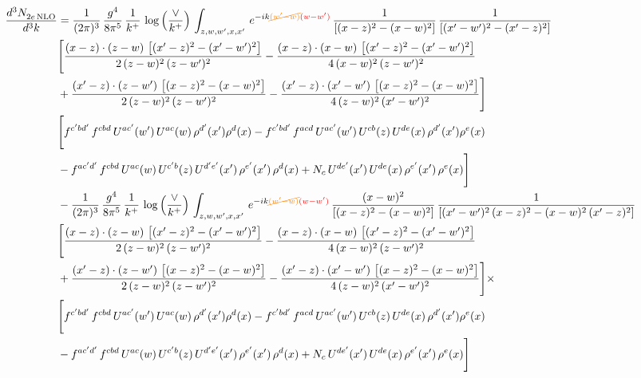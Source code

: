 \documentclass[9pt]{article}
\numberwithin{equation}{section}
\begin{document}
\begin{align}
 \frac{d^{3}N_{2e\,\rm NLO}^{\rm}}{d^{3}k}  & =  \frac{1}{(2\pi)^{3}}\, \frac{g^{4}}{8\pi^{5}}\,\frac{1}{k^{+}}\,\log{\left(\frac{\vee}{k^{+}}\right)}\,\int_{z,w,w^{\prime},x,x'}\, e^{-ik{\color{orange}\cancel{(w^{\prime}-w)}}{\color{red}(w-w^{\prime})}}\, \frac{1}{\left[(x-z)^{2}-(x-w)^{2}\right]}\, \frac{1}{\left[(x'-w')^{2} - (x'-z)^{2}\right]} \notag \\ & \Bigg[\frac{(x-z)\cdot (z-w)\, \left[(x'-z)^{2}-(x'-w')^{2}\right]}{2\, (z-w)^{2}\, (z-w')^{2}}  - \frac{(x-z)\cdot (x-w)\,\left[(x'-z)^{2}-(x'-w')^{2}\right] }{4\,(x-w)^{2}\,(z-w')^{2}}\notag \\ & +\frac{(x'-z)\cdot (z-w')\, \left[(x-z)^{2}-(x-w)^{2}\right]}{2\, (z-w)^{2}\, (z-w')^{2}}-\frac{(x'-z)\cdot (x'-w')\, \left[(x-z)^{2}-(x-w)^{2}\right]}{4\, (z-w)^{2}\,(x'-w')^{2}}\Bigg]\notag \\ & \Bigg[f^{c'bd'}\,f^{cbd}\, U^{ac'}(w')\,U^{ac}(w)\,\rho^{d'}(x')\rho^{d}(x)- f^{c'bd'}\,f^{acd}\,U^{ac'}(w')\,U^{cb}(z)\,U^{de}(x)\,\rho^{d'}(x')\rho^{e}(x) \notag \\ & -f^{ac'd'}\,f^{cbd}\,U^{ac}(w)\,U^{c'b}(z)\,U^{d'e'}(x')\,\rho^{e'}(x')\,\rho^{d}(x) +N_{c}\,U^{de'}(x')\,U^{de}(x)\,\rho^{e'}(x')\,\rho^{e}(x)\Bigg] \notag \\ & -\frac{1}{(2\pi)^{3}}\, \frac{g^{4}}{8\pi^{5}}\,\frac{1}{k^{+}}\,\log{\left(\frac{\vee}{k^{+}}\right)}\,\int_{z,w,w^{\prime},x,x'}\, e^{-ik{\color{orange}\cancel{(w^{\prime}-w)}}{\color{red}(w-w^{\prime})}}\,\frac{(x-w)^{2}}{\left[(x-z)^{2}-(x-w)^{2}\right]}\, \frac{1}{\left[(x'-w')^{2}\, (x-z)^{2} - (x-w)^{2}\, (x'-z)^{2}\right]} \notag \\ & \Bigg[\frac{(x-z)\cdot (z-w)\, \left[(x'-z)^{2}-(x'-w')^{2}\right]}{2\, (z-w)^{2}\, (z-w')^{2}}  - \frac{(x-z)\cdot (x-w)\,\left[(x'-z)^{2}-(x'-w')^{2}\right] }{4\,(x-w)^{2}\,(z-w')^{2}}\notag \\ & +\frac{(x'-z)\cdot (z-w')\, \left[(x-z)^{2}-(x-w)^{2}\right]}{2\, (z-w)^{2}\, (z-w')^{2}}-\frac{(x'-z)\cdot (x'-w')\, \left[(x-z)^{2}-(x-w)^{2}\right]}{4\, (z-w)^{2}\,(x'-w')^{2}}\Bigg]\times\,\notag \\ & \Bigg[f^{c'bd'}\,f^{cbd}\, U^{ac'}(w')\,U^{ac}(w)\,\rho^{d'}(x')\rho^{d}(x)- f^{c'bd'}\,f^{acd}\,U^{ac'}(w')\,U^{cb}(z)\,U^{de}(x)\,\rho^{d'}(x')\rho^{e}(x) \notag \\ & -f^{ac'd'}\,f^{cbd}\,U^{ac}(w)\,U^{c'b}(z)\,U^{d'e'}(x')\,\rho^{e'}(x')\,\rho^{d}(x) +N_{c}\,U^{de'}(x')\,U^{de}(x)\,\rho^{e'}(x')\,\rho^{e}(x)\Bigg] \notag \\

\end{align}
\end{document}

